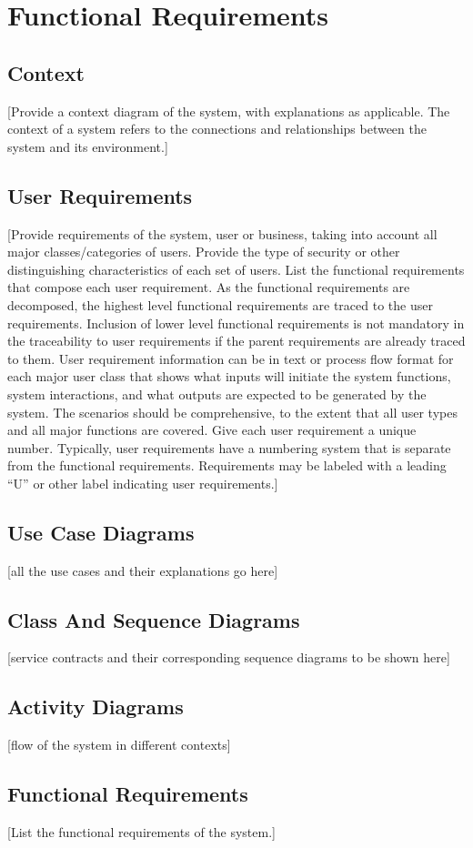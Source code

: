 \documentclass[a4paper,12pt]{article}
\begin{document}
\section{Functional Requirements}
\subsection{Context}
[Provide a context diagram of the system, with explanations as applicable.  The context of a system refers to the connections and relationships between the system and its environment.]

\subsection{User Requirements}
[Provide requirements of the system, user or business, taking into account all major classes/categories of users.  Provide the type of security or other distinguishing characteristics of each set of users.  List the functional requirements that compose each user requirement.  As the functional requirements are decomposed, the highest level functional requirements are traced to the user requirements.  Inclusion of lower level functional requirements is not mandatory in the traceability to user requirements if the parent requirements are already traced to them.
User requirement information can be in text or process flow format for each major user class that shows what inputs will initiate the system functions, system interactions, and what outputs are expected to be generated by the system.  The scenarios should be comprehensive, to the extent that all user types and all major functions are covered.  Give each user requirement a unique number.  Typically, user requirements have a numbering system that is separate from the functional requirements.  Requirements may be labeled with a leading “U” or other label indicating user requirements.]


\subsection{Use Case Diagrams}
[all the use cases and their explanations go here]

\subsection{Class And Sequence Diagrams}
[service contracts and their corresponding sequence diagrams to be shown here]

\subsection{Activity Diagrams}
[flow of the system in different contexts]

\subsection{Functional Requirements}
[List the functional requirements of the system.]
\end{document}
